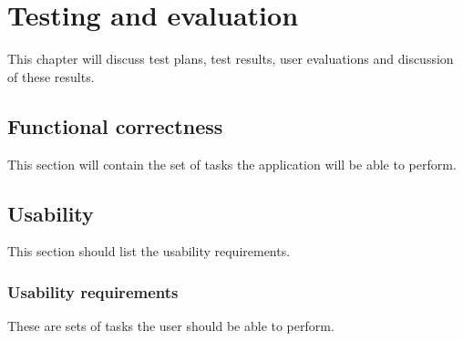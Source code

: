 \chapter{Testing and evaluation}
This chapter will discuss test plans, test results, user evaluations and discussion of these results.

\section{Functional correctness}
This section will contain the set of tasks the application will be able to perform.

\section{Usability}
This section should list the usability requirements.

\subsection{Usability requirements}
These are sets of tasks the user should be able to perform.

